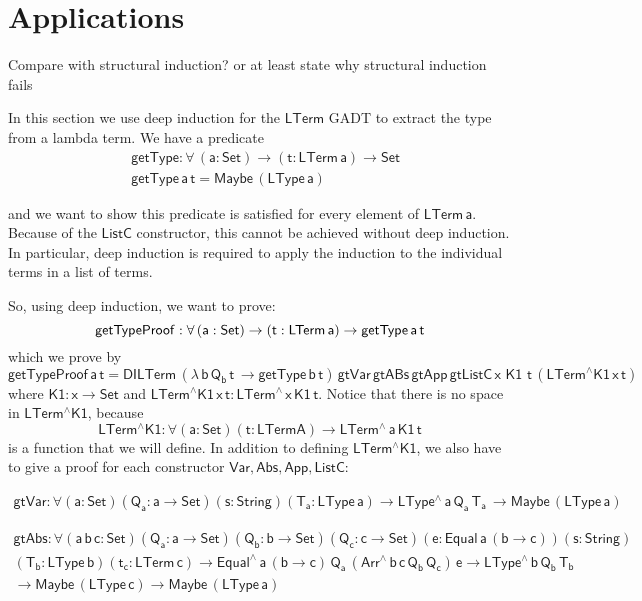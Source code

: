 \documentclass[acmsmall,screen,review,anonymous]{acmart}
\theoremstyle{definition}
\begin{document}
\section{Applications}

{\color{red} Compare with structural induction? or at least state why structural induction fails } 

In this section we use deep induction for the $\mathsf{LTerm}$ GADT to 
extract the type from a lambda term. 
We have a predicate 
\begin{align*}
  &\mathsf{getType : \forall \, (a : Set) \to (t : LTerm\,a) \to Set} \\
  &\mathsf{getType \,a \,t = Maybe \, (LType \, a)}
\end{align*}

and we want to show this predicate is satisfied for every element of $\mathsf{LTerm\,a}$.
Because of the $\mathsf{ListC}$ constructor, this cannot be achieved without 
deep induction. In particular, deep induction is required to apply the induction to the 
individual terms in a list of terms. 

So, using deep induction, we want to prove: 
\[
  \mathsf{getTypeProof : \forall \, (a : Set) \to (t : LTerm\,a) \to getType \,a \,t} \\
\]
which we prove by 
\[
  \mathsf{getTypeProof \,a \,t = 
    DILTerm\, (\lambda \, b\, Q_b\, t\, \to getType \,b\, t) \,
    gtVar\,  gtABs\,  gtApp\,  gtListC\,  x\,\, K1\,\, t\, (LTerm^{\wedge}K1\, x\, t)
    }
\]
where $\mathsf{K1 : x \to Set}$ and $\mathsf{LTerm^{\wedge}K1\, x\, t : LTerm^{\wedge}\, x\, K1\, t}$.
Notice that there is no space in $\mathsf{LTerm^{\wedge}K1}$, because
\[
  \mathsf{LTerm^{\wedge}K1 : \forall (a : Set) (t : LTerm A) \to LTerm^{\wedge}\, a\, K1\,t}
\]
is a function that we will define. In addition to defining $\mathsf{LTerm^{\wedge}K1}$,
we also have to give a proof for each constructor $\mathsf{Var, Abs, App, ListC}$:

\begin{multline*}
  \mathsf{gtVar : \forall (a : Set) (Q_a : a \to Set) (s : String) (T_a : LType\, a) 
      \to LType^{\wedge} \, a\, Q_a\, T_a\, \to Maybe\, (LType\, a)}
\end{multline*}

\begin{multline*}
    \mathsf{gtAbs : \forall (a \, b\, c: Set) (Q_a : a \to Set) (Q_b : b \to Set) (Q_c : c \to Set) 
      (e : Equal\, a\, (b \to c)) (s : String)} \\ 
    \mathsf{ (T_b : LType\, b) (t_c : LTerm \, c)
      \to Equal^{\wedge}\, a\, (b \to c)\, Q_a\, (Arr^{\wedge}\, b\, c\, Q_b\, Q_c)\, e
      \to LType^{\wedge} \, b\, Q_b\, T_b} \\ 
    \mathsf{
      \to Maybe\, (LType\,c) \to Maybe\, (LType\, a)}
\end{multline*}
\end{document}
